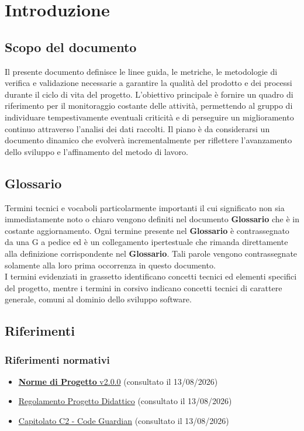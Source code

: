\documentclass[12pt, a4paper]{article}
\begin{document}
\section{Introduzione}
\subsection{Scopo del documento}
Il presente documento definisce le linee guida, le metriche, le metodologie di verifica e validazione necessarie a garantire la qualità del prodotto e dei processi durante il ciclo di vita del progetto. L'obiettivo principale è fornire un quadro di riferimento per il monitoraggio costante delle attività, permettendo al gruppo di individuare tempestivamente eventuali criticità e di perseguire un miglioramento continuo attraverso l'analisi dei dati raccolti. Il piano è da considerarsi un documento dinamico che evolverà incrementalmente per riflettere l'avanzamento dello sviluppo e l'affinamento del metodo di lavoro.

\subsection{Glossario}
Termini tecnici e vocaboli particolarmente importanti il cui
significato non sia immediatamente noto o chiaro vengono definiti nel
documento \textbf{Glossario} che è in costante aggiornamento. Ogni termine
presente nel \textbf{Glossario} è contrassegnato da una G a pedice ed è un
collegamento ipertestuale che rimanda direttamente alla definizione
corrispondente nel \textbf{Glossario}. Tali parole vengono contrassegnate
solamente alla loro prima occorrenza in questo documento.\\
\newline
I termini evidenziati in grassetto identificano concetti tecnici ed elementi specifici del progetto, mentre i termini in corsivo indicano concetti tecnici di carattere generale, comuni al dominio dello sviluppo software.

\subsection{Riferimenti}
\subsubsection{Riferimenti normativi}
\begin{itemize}
\item
  \href{https://skynetunigroup.github.io/Code_Guardian/Documentazione/PB/norme_di_progetto_v2.0.0.pdf}{\textbf{Norme di Progetto} v2.0.0} (consultato il 13/08/2026)
\item
  \href{https://www.math.unipd.it/~tullio/IS-1/2025/Dispense/PD1.pdf}{Regolamento Progetto Didattico} (consultato il 13/08/2026)
\item
  \href{https://www.math.unipd.it/~tullio/IS-1/2025/Progetto/C2.pdf}{Capitolato C2 - Code Guardian} (consultato il 13/08/2026)
\end{itemize}
\end{document}
